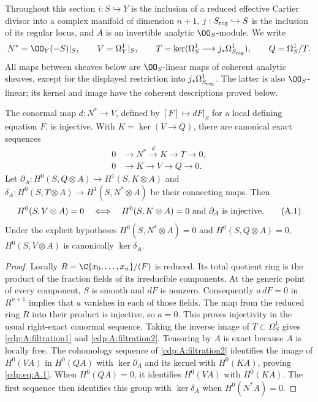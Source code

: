 
Throughout this section $i:S\hookrightarrow Y$ is the inclusion of a reduced effective Cartier divisor into a complex manifold of dimension $n+1$, $j:S_{\rm reg}\hookrightarrow S$ is the inclusion of its regular locus, and $A$ is an invertible analytic $\OO_S$-module. We write
\[
 N^*=\OO_Y(-S)|_S,\qquad V=\Omega_Y^1|_S,\qquad
 T=\ker(\Omega_S^1\longrightarrow j_*\Omega^1_{S_{\rm reg}}),\qquad Q=\Omega_S^1/T.
\]
All maps between sheaves below are $\OO_S$-linear maps of coherent analytic sheaves, except for the displayed restriction into $j_*\Omega^1_{S_{\rm reg}}$. The latter is also $\OO_S$-linear; its kernel and image have the coherent descriptions proved below.

\begin{proposition}\label{cdp:st:A.1.1}
The conormal map $d:N^*\to V$, defined by $[F]\mapsto dF|_S$ for a local defining equation $F$, is injective. With $K=\ker(V\to Q)$, there are canonical exact sequences
\begin{align}
0&\longrightarrow N^*\xrightarrow{d}K\longrightarrow T\longrightarrow0,
\label{cdp:A:filtration1}\\
0&\longrightarrow K\longrightarrow V\longrightarrow Q\longrightarrow0.
\label{cdp:A:filtration2}
\end{align}
Let $\partial_A:H^0(S,Q\otimes A)\to H^1(S,K\otimes A)$ and $\delta_A:H^0(S,T\otimes A)\to H^1(S,N^*\otimes A)$ be their connecting maps. Then
\[
 H^0(S,V\otimes A)=0
 \quad\Longleftrightarrow\quad
 H^0(S,K\otimes A)=0\ \hbox{and}\ \partial_A\hbox{ is injective}.
\tag{A.1}\label{cdp:eq:A.1}
\]
Under the explicit hypotheses $H^0(S,N^*\otimes A)=0$ and $H^0(S,Q\otimes A)=0$, $H^0(S,V\otimes A)$ is canonically $\ker\delta_A$.
\end{proposition}
\begin{proof}
Locally $R=\C\{x_0,\ldots,x_n\}/(F)$ is reduced. Its total quotient ring is the product of the fraction fields of its irreducible components. At the generic point of every component, $S$ is smooth and $dF$ is nonzero. Consequently $a\,dF=0$ in $R^{n+1}$ implies that $a$ vanishes in each of those fields. The map from the reduced ring $R$ into their product is injective, so $a=0$. This proves injectivity in the usual right-exact conormal sequence. Taking the inverse image of $T\subset\Omega_S^1$ gives \eqref{cdp:A:filtration1} and \eqref{cdp:A:filtration2}. Tensoring by $A$ is exact because $A$ is locally free. The cohomology sequence of \eqref{cdp:A:filtration2} identifies the image of $H^0(VA)$ in $H^0(QA)$ with $\ker\partial_A$ and its kernel with $H^0(KA)$, proving \eqref{cdp:eq:A.1}. When $H^0(QA)=0$, it identifies $H^0(VA)$ with $H^0(KA)$. The first sequence then identifies this group with $\ker\delta_A$ when $H^0(N^*A)=0$.
\end{proof}

